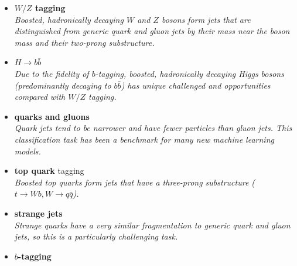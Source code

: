 \documentclass[12pt,letterpaper]{article}
\begin{document}
\begin{itemize}
\begin{itemize}
\begin{itemize}
			\item \textbf{$W/Z$ tagging}~\cite{deOliveira:2015xxd,Barnard:2016qma,Louppe:2017ipp,Sirunyan:2020lcu,Chen:2019uar,1811770,Dreyer:2020brq,Kim:2021gtv,Subba:2022czw,Aguilar-Saavedra:2023pde,Athanasakos:2023fhq,Grossi:2023fqq,Bogatskiy:2023nnw}
			\\\textit{Boosted, hadronically decaying $W$ and $Z$ bosons form jets that are distinguished from generic quark and gluon jets by their mass near the boson mass and their two-prong substructure.}
			\item \textbf{$H\rightarrow b\bar{b}$}~\cite{Datta:2019ndh,Lin:2018cin,Moreno:2019neq,Chakraborty:2019imr,Sirunyan:2020lcu,Chung:2020ysf,Tannenwald:2020mhq,guo2020boosted,Abbas:2020khd,Jang:2021eph,Khosa:2021cyk}
			\\\textit{Due to the fidelity of $b$-tagging, boosted, hadronically decaying Higgs bosons (predominantly decaying to $b\bar{b}$) has unique challenged and opportunities compared with $W/Z$ tagging.}
			\item \textbf{quarks and gluons}~\cite{ATL-PHYS-PUB-2017-017,Komiske:2016rsd,Cheng:2017rdo,Stoye:DLPS2017,Chien:2018dfn,Moreno:2019bmu,Kasieczka:2018lwf,1806025,Lee:2019ssx,Lee:2019cad,Dreyer:2020brq,Romero:2021qlf,Filipek:2021qbe,Dreyer:2021hhr,Bright-Thonney:2022xkx,CrispimRomao:2023ssj,Athanasakos:2023fhq,He:2023cfc,Shen:2023ofd}
			\\\textit{Quark jets tend to be narrower and have fewer particles than gluon jets.  This classification task has been a benchmark for many new machine learning models.}
			\item \textbf{top quark} tagging~\cite{Almeida:2015jua,Stoye:DLPS2017,Kasieczka:2019dbj,Chakraborty:2020yfc,Diefenbacher:2019ezd,Butter:2017cot,Kasieczka:2017nvn,Macaluso:2018tck,Bhattacharya:2020vzu,Lim:2020igi,Dreyer:2020brq,Aguilar-Saavedra:2021rjk,Andrews:2021ejw,Dreyer:2022yom,Ahmed:2022hct,Munoz:2022gjq,Bhattacherjee:2022gjq,Choi:2023slq,Keicher:2023mer,He:2023cfc,Bogatskiy:2023nnw,Shen:2023ofd,Isildak:2023dnf}
			\\\textit{Boosted top quarks form jets that have a three-prong substructure ($t\rightarrow Wb,W\rightarrow q\bar{q}$).}
			\item \textbf{strange jets}~\cite{Nakai:2020kuu,Erdmann:2019blf,Erdmann:2020ovh,Subba:2023rpm}
			\\\textit{Strange quarks have a very similar fragmentation to generic quark and gluon jets, so this is a particularly challenging task.}
			\item \textbf{$b$-tagging}~\cite{Sirunyan:2017ezt,Guest:2016iqz,Keck:2018lcd,bielkov2020identifying,Bols:2020bkb,ATL-PHYS-PUB-2017-003,ATL-PHYS-PUB-2020-014,Liao:2022ufk,Stein:2023cnt,ATLAS:2023gog}

\end{itemize}
\end{itemize}
\end{itemize}
\end{document}
